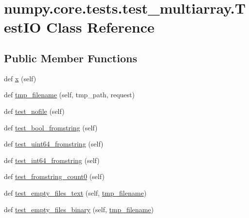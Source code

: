 \hypertarget{classnumpy_1_1core_1_1tests_1_1test__multiarray_1_1TestIO}{}\section{numpy.\+core.\+tests.\+test\+\_\+multiarray.\+Test\+IO Class Reference}
\label{classnumpy_1_1core_1_1tests_1_1test__multiarray_1_1TestIO}
\subsection*{Public Member Functions}
\begin{DoxyCompactItemize}
\item 
def \hyperlink{classnumpy_1_1core_1_1tests_1_1test__multiarray_1_1TestIO_a1b5775b0760845c1d869ff14e6a302a0}{x} (self)
\item 
def \hyperlink{classnumpy_1_1core_1_1tests_1_1test__multiarray_1_1TestIO_a7b9e3f835dee7e1edaf3be6f1d2ee254}{tmp\+\_\+filename} (self, tmp\+\_\+path, request)
\item 
def \hyperlink{classnumpy_1_1core_1_1tests_1_1test__multiarray_1_1TestIO_aaf0ca5ff7177c6aa9d2db590af8a01fc}{test\+\_\+nofile} (self)
\item 
def \hyperlink{classnumpy_1_1core_1_1tests_1_1test__multiarray_1_1TestIO_ad6a52506de7a91b2d43a70092a517716}{test\+\_\+bool\+\_\+fromstring} (self)
\item 
def \hyperlink{classnumpy_1_1core_1_1tests_1_1test__multiarray_1_1TestIO_a3b6cbeb708f78bd7cb67f5ed0d5e1a72}{test\+\_\+uint64\+\_\+fromstring} (self)
\item 
def \hyperlink{classnumpy_1_1core_1_1tests_1_1test__multiarray_1_1TestIO_a8ef0b46d683f32d44d2407eecbebe04d}{test\+\_\+int64\+\_\+fromstring} (self)
\item 
def \hyperlink{classnumpy_1_1core_1_1tests_1_1test__multiarray_1_1TestIO_a4c8c7ab90f3c041681fb9ed3212e1db5}{test\+\_\+fromstring\+\_\+count0} (self)
\item 
def \hyperlink{classnumpy_1_1core_1_1tests_1_1test__multiarray_1_1TestIO_a7eb1d6e4b26bc7adc0648d8cd951cdf8}{test\+\_\+empty\+\_\+files\+\_\+text} (self, \hyperlink{classnumpy_1_1core_1_1tests_1_1test__multiarray_1_1TestIO_a7b9e3f835dee7e1edaf3be6f1d2ee254}{tmp\+\_\+filename})
\item 
def \hyperlink{classnumpy_1_1core_1_1tests_1_1test__multiarray_1_1TestIO_a2b157d4f5f089a00230730c12244f9b6}{test\+\_\+empty\+\_\+files\+\_\+binary} (self, \hyperlink{classnumpy_1_1core_1_1tests_1_1test__multiarray_1_1TestIO_a7b9e3f835dee7e1edaf3be6f1d2ee254}{tmp\+\_\+filename})

\end{DoxyCompactItemize}
